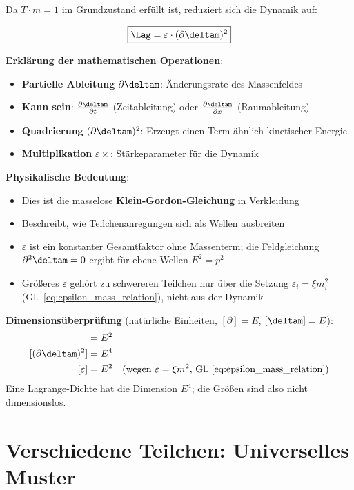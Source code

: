 	Da $T \cdot m = 1$ im Grundzustand erfüllt ist, reduziert sich die Dynamik auf:
	
	\begin{equation}
		\boxed{\Lag = \varepsilon \cdot (\partial \deltam)^2}
		\label{eq:particle_lagrangian}
	\end{equation}
	
	\textbf{Erklärung der mathematischen Operationen}:
	\begin{itemize}
		\item \textbf{Partielle Ableitung} $\partial \deltam$: Änderungsrate des Massenfeldes
		\item \textbf{Kann sein}: $\frac{\partial \deltam}{\partial t}$ (Zeitableitung) oder $\frac{\partial \deltam}{\partial x}$ (Raumableitung)
		\item \textbf{Quadrierung} $(\partial \deltam)^2$: Erzeugt einen Term ähnlich kinetischer Energie
		\item \textbf{Multiplikation} $\varepsilon \times$: Stärkeparameter für die Dynamik
	\end{itemize}
	
	\textbf{Physikalische Bedeutung}:
	\begin{itemize}
		\item Dies ist die masselose \textbf{Klein-Gordon-Gleichung} in Verkleidung
		\item Beschreibt, wie Teilchenanregungen sich als Wellen ausbreiten
		\item $\varepsilon$ ist ein konstanter Gesamtfaktor ohne Massenterm; die Feldgleichung $\partial^2\deltam = 0$ ergibt für ebene Wellen $E^2 = p^2$
		\item Größeres $\varepsilon$ gehört zu schwereren Teilchen nur über die Setzung $\varepsilon_i = \xi m_i^2$ (Gl.~\eqref{eq:epsilon_mass_relation}), nicht aus der Dynamik
	\end{itemize}
	
	\textbf{Dimensionsüberprüfung} (natürliche Einheiten, $[\partial] = E$, $[\deltam] = E$):
	\begin{align}
		[\partial \deltam] &= E^2 \\
		[(\partial \deltam)^2] &= E^4 \\
		[\varepsilon] &= E^2 \quad \text{(wegen } \varepsilon = \xi m^2\text{, Gl.~\eqref{eq:epsilon_mass_relation})}
	\end{align}
	Eine Lagrange-Dichte hat die Dimension $E^4$; die Größen sind also nicht dimensionslos.
	
	\section{Verschiedene Teilchen: Universelles Muster}
	

